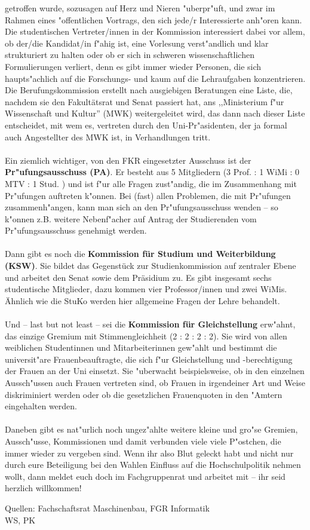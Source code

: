 getroffen wurde, sozusagen auf Herz und Nieren "uberpr"uft, und zwar im Rahmen 
eines "offentlichen Vortrags, den sich jede/r Interessierte anh"oren kann. Die 
 studentischen Vertreter/innen in der Kommission interessiert dabei vor allem, ob 
der/die Kandidat/in f"ahig ist, eine Vorlesung verst"andlich und klar 
strukturiert zu halten oder ob er sich in schweren wissenschaftlichen 
Formulierungen verliert, denn es gibt immer wieder Personen, die sich
haupts"achlich auf die Forschungs- und kaum auf die Lehraufgaben konzentrieren.
Die Berufungskommission 
erstellt nach ausgiebigen Beratungen eine Liste, die, nachdem sie den Fakultätsrat und Senat 
passiert hat, ans ,,Ministerium f"ur 
Wissenschaft und Kultur'' (MWK) weitergeleitet wird, das dann nach dieser 
Liste entscheidet, mit wem es, vertreten durch den Uni-Pr"asidenten, der ja 
formal auch Angestellter des MWK ist, in Verhandlungen tritt.
\\
\\
Ein ziemlich wichtiger, von den FKR eingesetzter Ausschuss ist der 
\textbf{Pr"ufungsausschuss (PA)}. Er besteht aus 5 Mitgliedern (3 Prof. : 1 WiMi : 0 MTV : 
1 Stud. ) und ist f"ur alle Fragen zust"andig, die im Zusammenhang mit Pr"ufungen
auftreten k"onnen. Bei (fast) allen Problemen, die mit Pr"ufungen 
zusammenh"angen, kann
man sich an den Pr"ufungsausschuss wenden -- so k"onnen z.B. weitere
Nebenf"acher auf Antrag der Studierenden vom Pr"ufungsausschuss genehmigt
werden.
\\
\\
Dann gibt es noch die \textbf{Kommission für Studium und Weiterbildung (KSW)}. 
Sie bildet das Gegenstück zur Studienkommission auf zentraler Ebene und arbeitet den Senat sowie dem 
Präsidium zu. Es gibt insgesamt sechs studentische Mitglieder, dazu kommen vier Professor/innen und zwei WiMis. 
Ähnlich wie die StuKo werden hier allgemeine Fragen der Lehre behandelt.
\\
\\
Und -- last but not least -- sei die \textbf{Kommission für Gleichstellung} 
erw"ahnt, das einzige Gremium mit Stimmengleichheit (2 : 2 : 2 : 2). Sie wird von allen 
weiblichen Studentinnen und Mitarbeiterinnen gew"ahlt und bestimmt 
 die universit"are Frauenbeauftragte, die sich f"ur Gleichstellung und 
-berechtigung der Frauen an der Uni einsetzt. Sie "uberwacht beispielsweise, ob 
in den einzelnen Aussch"ussen auch Frauen vertreten sind, ob Frauen in 
irgendeiner Art und Weise diskriminiert werden oder ob die gesetzlichen 
Frauenquoten in den "Amtern eingehalten werden. 
\\
\\
Daneben gibt es nat"urlich noch ungez"ahlte weitere kleine und gro"se Gremien, 
Aussch"usse, Kommissionen und damit verbunden viele viele P"ostchen, die immer 
wieder zu vergeben sind. Wenn ihr also Blut geleckt habt und nicht nur durch 
eure Beteiligung bei den Wahlen Einfluss auf die Hochschulpolitik nehmen wollt, 
dann meldet euch doch im Fachgruppenrat und arbeitet mit -- ihr seid herzlich 
willkommen!

{Quellen: Fachschaftsrat Maschinenbau, FGR Informatik\\WS, PK}
